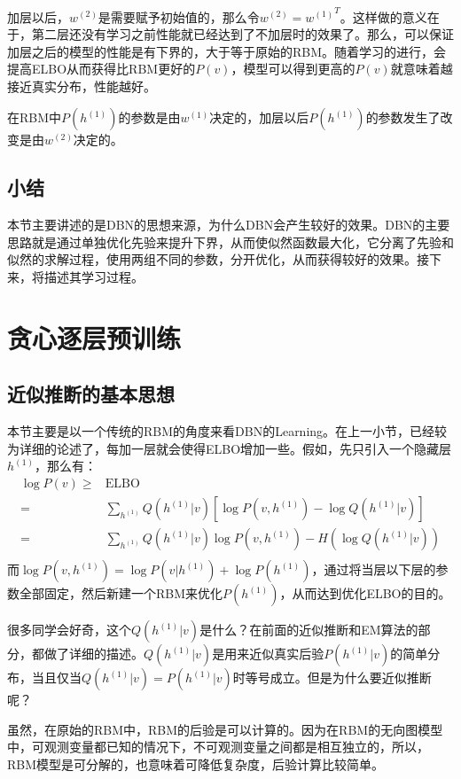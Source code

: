 \documentclass[a4paper]{article}
\begin{document}
加层以后，$w^{(2)}$是需要赋予初始值的，那么令$w^{(2)} = {w^{(1)}}^T$。这样做的意义在于，第二层还没有学习之前性能就已经达到了不加层时的效果了。那么，可以保证加层之后的模型的性能是有下界的，大于等于原始的RBM。随着学习的进行，会提高ELBO从而获得比RBM更好的$P(v)$，模型可以得到更高的$P(v)$就意味着越接近真实分布，性能越好。

在RBM中$P(h^{(1)})$的参数是由$w^{(1)}$决定的，加层以后$P(h^{(1)})$的参数发生了改变是由$w^{(2)}$决定的。

\subsection{小结}
本节主要讲述的是DBN的思想来源，为什么DBN会产生较好的效果。DBN的主要思路就是通过单独优化先验来提升下界，从而使似然函数最大化，它分离了先验和似然的求解过程，使用两组不同的参数，分开优化，从而获得较好的效果。接下来，将描述其学习过程。

\section{贪心逐层预训练}
\subsection{近似推断的基本思想}
本节主要是以一个传统的RBM的角度来看DBN的Learning。在上一小节，已经较为详细的论述了，每加一层就会使得ELBO增加一些。假如，先只引入一个隐藏层$h^{(1)}$，那么有：
\begin{equation}
    \begin{split}
        \log P(v) \geq & \text{ELBO} \\
        = & \sum_{h^{(1)}} Q(h^{(1)}|v) \left[ \log P(v,h^{(1)}) - \log Q(h^{(1)}|v) \right] \\
        = & \sum_{h^{(1)}} Q(h^{(1)}|v) \log P(v,h^{(1)}) - H\left( \log Q(h^{(1)}|v)\right) \\
    \end{split}
\end{equation}
而$\log P(v,h^{(1)}) = \log P(v|h^{(1)}) + \log P(h^{(1)})$，通过将当层以下层的参数全部固定，然后新建一个RBM来优化$P(h^{(1)})$，从而达到优化ELBO的目的。

很多同学会好奇，这个$Q(h^{(1)}|v)$是什么？在前面的近似推断和EM算法的部分，都做了详细的描述。$Q(h^{(1)}|v)$是用来近似真实后验$P(h^{(1)}|v)$的简单分布，当且仅当$Q(h^{(1)}|v) = P(h^{(1)}|v)$时等号成立。但是为什么要近似推断呢？

虽然，在原始的RBM中，RBM的后验是可以计算的。因为在RBM的无向图模型中，可观测变量都已知的情况下，不可观测变量之间都是相互独立的，所以，RBM模型是可分解的，也意味着可降低复杂度，后验计算比较简单。
\end{document}
